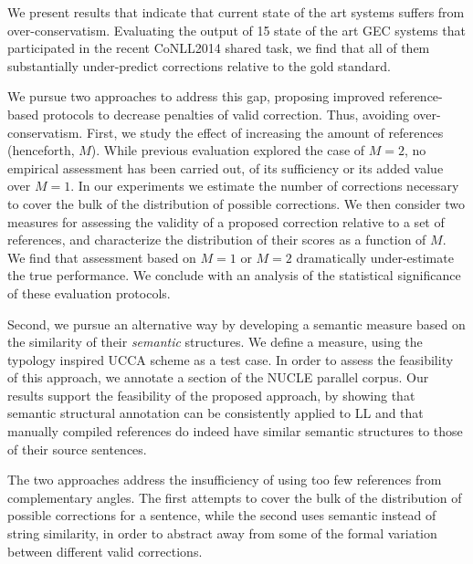 \documentclass[11pt]{article}
\begin{document}
We present results that indicate that current state of the art systems suffers
from over-conservatism. Evaluating the output of 15 state
of the art GEC systems that participated
in the recent CoNLL2014 shared task, we find that all of them
substantially under-predict corrections relative to the gold standard. 

We pursue two approaches to address this gap, proposing
improved reference-based protocols to decrease penalties of valid correction. Thus, avoiding over-conservatism.
First, we study the effect of increasing the amount of references
(henceforth, $M$).
While previous evaluation explored the case of $M=2$,
no empirical assessment has been carried out, of its sufficiency
or its added value over $M=1$.
In our experiments we estimate the number of corrections necessary
to cover the bulk of the distribution of possible corrections.
We then consider two measures for
assessing the validity of a proposed correction relative to a set of references,
and characterize the distribution of their scores as a function of $M$.
We find that assessment based on $M=1$ or $M=2$ dramatically under-estimate
the true performance. 
We conclude with an analysis of
the statistical significance of these evaluation protocols.

Second, we pursue an alternative way by developing a semantic measure based
on the similarity of their {\it semantic} structures.
We define a measure, using the typology inspired UCCA scheme \cite{abend2013universal} as a
test case.
In order to assess the feasibility of this approach, we annotate a
section of the NUCLE
parallel corpus. Our results support the feasibility of the proposed approach,
by showing that semantic structural annotation can be consistently applied
to LL and that manually compiled references do indeed
have similar semantic structures to those of their source sentences.

The two approaches address the insufficiency of using too few references from
complementary angles. 
The first attempts to cover the bulk of the distribution of possible
corrections for a sentence, while the second
uses semantic instead of string similarity, in order to abstract away
from some of the formal variation between different valid corrections.
 



\appendix
\end{document}
